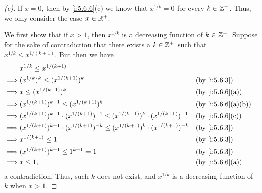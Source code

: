 \begin{proof}[(e)]
  If \(x = 0\), then by \cref{i:5.6.6}(c) we know that \(x^{1 / k} = 0\) for every \(k \in \mathbb{Z}^+\).
  Thus, we only consider the case \(x \in \mathbb{R}^+\).

  We first show that if \(x > 1\), then \(x^{1 / k}\) is a decreasing function of \(k \in \mathbb{Z}^+\).
  Suppose for the sake of contradiction that there exists a \(k \in \mathbb{Z}^+\) such that \(x^{1 / k} \leq x^{1 / (k + 1)}\).
  But then we have
  \begin{align*}
             & x^{1 / k} \leq x^{1 / (k + 1)}                                                                                                      \\
    \implies & (x^{1 / k})^k \leq (x^{1 / (k + 1)})^k                                                                       &  & \by{i:5.6.3}      \\
    \implies & x \leq (x^{1 / (k + 1)})^k                                                                                   &  & \by{i:5.6.6}[a]   \\
    \implies & (x^{1 / (k + 1)})^{k + 1} \leq (x^{1 / (k + 1)})^k                                                           &  & \by{i:5.6.6}[a,b] \\
    \implies & (x^{1 / (k + 1)})^{k + 1} \cdot (x^{1 / (k + 1)})^{-1} \leq (x^{1 / (k + 1)})^k \cdot (x^{1 / (k + 1)})^{-1} &  & \by{i:5.6.6}[c]   \\
    \implies & (x^{1 / (k + 1)})^{k + 1} \cdot (x^{1 / (k + 1)})^{-k} \leq (x^{1 / (k + 1)})^k \cdot (x^{1 / (k + 1)})^{-k} &  & \by{i:5.6.3}      \\
    \implies & x^{1 / (k + 1)} \leq 1                                                                                       &  & \by{i:5.6.3}      \\
    \implies & (x^{1 / (k + 1)})^{k + 1} \leq 1^{k + 1} = 1                                                                 &  & \by{i:5.6.3}      \\
    \implies & x \leq 1,                                                                                                    &  & \by{i:5.6.6}[a]
  \end{align*}
  a contradiction.
  Thus, such \(k\) does not exist, and \(x^{1 / k}\) is a decreasing function of \(k\) when \(x > 1\).


\end{proof}
